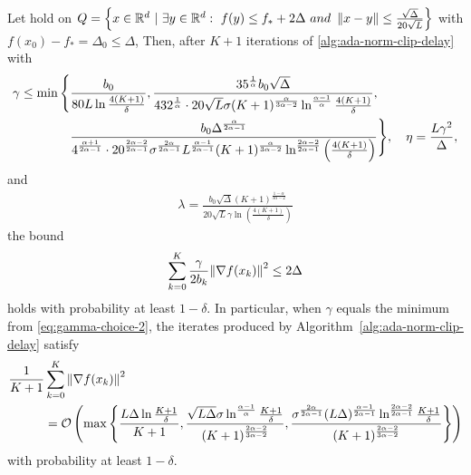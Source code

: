 \documentclass{article}
\begin{document}
\begin{theorem}
\label{thm:nonconvex-case-conv}
Let  hold on $Q = \Big\{x \in {\mathbb R}^d \ | \ \exists y \in {\mathbb R}^d: \ f(y) \leq f_* + 2\Delta \ and \ \left\lVert x - y\right\rVert \leq \frac{\sqrt{\Delta}}{20\sqrt{L}}\Big\}$ with $f(x_0) - f_* = \Delta_0 \leq \Delta$, Then, after $K+1$ iterations of \cref{alg:ada-norm-clip-delay} with
    \begin{align}
    \label{eq:gamma-choice-2}
        \gamma \leq \min\Bigg\{&\frac{b_0}{80L\ln\frac{4(K+1)}{\delta}}, \frac{35^{\frac{1}{\alpha}}b_0\sqrt{\Delta}}{432^{\frac{1}{\alpha}}\cdot 20\sqrt{L}\sigma (K+1)^{\frac{\alpha}{3\alpha - 2}}\ln^{\frac{\alpha - 1}{\alpha}}\frac{4(K+1)}{\delta} },
        \nonumber\\
        &{\color{black}\frac{b_0 \Delta^{\frac{\alpha}{2\alpha-1}}}{4^{\frac{\alpha+1}{2\alpha-1}}\cdot 20^{\frac{2\alpha-2}{2\alpha-1}} \sigma^{\frac{2\alpha}{2\alpha-1}} L^{\frac{\alpha-1}{2\alpha-1}} (K+1)^{\frac{\alpha}{3\alpha-2}} \ln^{\frac{2\alpha-2}{2\alpha-1}}\left(\frac{4(K+1)}{\delta}\right)}}\Bigg\}, \quad \eta = \frac{L\gamma^2}{\Delta},
    \end{align}
    and
    \begin{align}
    \label{eq:lambda-choice-2}
        \lambda = \frac{b_0\sqrt{\Delta} (K+1)^{\frac{1 - \alpha}{3\alpha - 2}}}{20\sqrt{L}\gamma \ln\left(\frac{4(K+1)}{\delta}\right)}
    \end{align}
    the bound 
    \begin{align*}
         \sum\limits_{k=0}^{K}\frac{\gamma}{2b_k}{\left\lVert\nabla f(x_k)\right\rVert}^2 \leq 2\Delta
    \end{align*}
    holds with probability at least $1 - \delta$. In particular, when $\gamma$ equals the minimum from \eqref{eq:gamma-choice-2}, the iterates produced by Algorithm~\ref{alg:ada-norm-clip-delay} satisfy
    \begin{align*}
        \frac{1}{K+1}&\sum\limits_{k=0}^{K}{\left\lVert\nabla f(x_k)\right\rVert}^2 \\
        &= {\cal O}\left(\max\left\{\frac{L\Delta \ln\frac{K+1}{\delta}}{K+1}, \frac{\sqrt{L\Delta}\sigma \ln^{\frac{\alpha-1}{\alpha}}\frac{K+1}{\delta}}{(K+1)^\frac{2\alpha-2}{3\alpha-2}}, {\color{black}\frac{\sigma^{\frac{2\alpha}{2\alpha-1}}(L\Delta)^\frac{\alpha-1}{2\alpha - 1} \ln^{\frac{2\alpha-2}{2\alpha-1}}\frac{K+1}{\delta}}{(K+1)^\frac{2\alpha-2}{3\alpha-2}}}\right\}\right)
    \end{align*}
    with probability at least $1 - \delta$.
\end{theorem}
\end{document}
